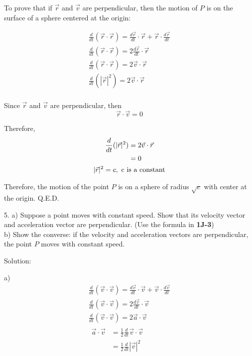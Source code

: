 \documentclass{article}
\begin{document}
To prove that if $\vec{r}$ and $\vec{v}$ are perpendicular, then the motion of 
$P$ is on the surface of a sphere centered at the origin:

\begin{gather*}
  \frac{d}{dt} (\vec{r} \cdot \vec{r}) = \frac{d\vec{r}}{dt} \cdot \vec{r} + \vec{r} \cdot \frac{d\vec{r}}{dt} \\
  \frac{d}{dt} (\vec{r} \cdot \vec{r}) = 2 \frac{d\vec{r}}{dt} \cdot \vec{r} \\
  \frac{d}{dt} (\vec{r} \cdot \vec{r}) = 2 \vec{v} \cdot \vec{r} \\
  \frac{d}{dt} (|\vec{r}|^2) = 2 \vec{v} \cdot \vec{r} \\
\end{gather*}

Since $\vec{r}$ and $\vec{v}$ are perpendicular, then
\begin{equation*}
  \vec{r} \cdot \vec{v} = 0
\end{equation*}

Therefore,
\begin{gather*}
  \begin{split}
    \frac{d}{dt} (|\vec{r}|^2) &= 2 \vec{v} \cdot \vec{r} \\
                               &= 0 \\
  \end{split} \\
  |\vec{r}|^2 = c ,\ \textnormal{c is a constant}
\end{gather*}

Therefore, the motion of the point $P$ is on a sphere of radius $\sqrt{c}$ with 
center at the origin. Q.E.D.

\bigskip

5. a) Suppose a point moves with constant speed. Show that its velocity vector 
and acceleration vector are perpendicular. (Use the formula in \textbf{1J-3}) \\
b) Show the converse: if the velocity and acceleration vectors are perpendicular, 
the point $P$ moves with constant speed.

Solution:

a) 
\begin{gather*}
  \frac{d}{dt} (\vec{v} \cdot \vec{v}) = \frac{d\vec{v}}{dt} \cdot \vec{v} + \vec{v} \cdot \frac{d\vec{v}}{dt} \\
  \frac{d}{dt} (\vec{v} \cdot \vec{v}) = 2 \frac{d\vec{v}}{dt} \cdot \vec{v} \\
  \frac{d}{dt} (\vec{v} \cdot \vec{v}) = 2 \vec{a} \cdot \vec{v} \\
  \begin{split}
    \vec{a} \cdot \vec{v} &= \frac{1}{2} \frac{d}{dt} \vec{v} \cdot \vec{v} \\
                          &= \frac{1}{2} \frac{d}{dt} |\vec{v}|^2 \\
  \end{split}
\end{gather*}
\end{document}
